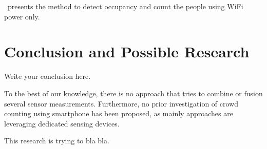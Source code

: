 \documentclass{article}
\begin{document}
\cite{thesis046}~presents the method to detect occupancy and count the people using WiFi power only.


\section{Conclusion and Possible Research}
Write your conclusion here.


To the best of our knowledge, there is no approach that tries to combine or fusion several sensor measurements. Furthermore, no prior investigation of crowd counting using smartphone has been proposed, as mainly approaches are leveraging dedicated sensing devices.

This research is trying to bla bla.

{}

\end{document}
